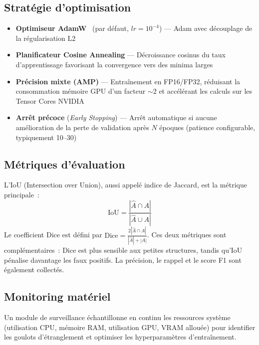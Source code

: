 \documentclass[12pt,a4paper]{report}
\begin{document}
\subsection{Strat\'egie d'optimisation}

\begin{itemize}
    \item \textbf{Optimiseur AdamW}~\cite{loshchilov2019adamw} (par d\'efaut, $lr=10^{-4}$) --- Adam avec d\'ecouplage de la r\'egularisation L2
    \item \textbf{Planificateur Cosine Annealing} --- D\'ecroissance cosinus du taux d'apprentissage favorisant la convergence vers des minima larges
    \item \textbf{Pr\'ecision mixte (AMP)} --- Entra\^inement en FP16/FP32, r\'eduisant la consommation m\'emoire GPU d'un facteur $\sim$2 et acc\'el\'erant les calculs sur les Tensor Cores NVIDIA
    \item \textbf{Arr\^et pr\'ecoce} (\textit{Early Stopping}) --- Arr\^et automatique si aucune am\'elioration de la perte de validation apr\`es $N$ \'epoques (patience configurable, typiquement 10--30)
\end{itemize}

\subsection{M\'etriques d'\'evaluation}

L'IoU (Intersection over Union), aussi appel\'e indice de Jaccard, est la m\'etrique principale~:
\[
    \text{IoU} = \frac{|\hat{A} \cap A|}{|\hat{A} \cup A|}
\]
Le coefficient Dice est d\'efini par $\text{Dice} = \frac{2|\hat{A} \cap A|}{|\hat{A}| + |A|}$. Ces deux m\'etriques sont compl\'ementaires~: Dice est plus sensible aux petites structures, tandis qu'IoU p\'enalise davantage les faux positifs. La pr\'ecision, le rappel et le score F1 sont \'egalement collect\'es.

\subsection{Monitoring mat\'eriel}

Un module de surveillance \'echantillonne en continu les ressources syst\`eme (utilisation CPU, m\'emoire RAM, utilisation GPU, VRAM allou\'ee) pour identifier les goulots d'\'etranglement et optimiser les hyperparam\`etres d'entra\^inement.


\end{document}

